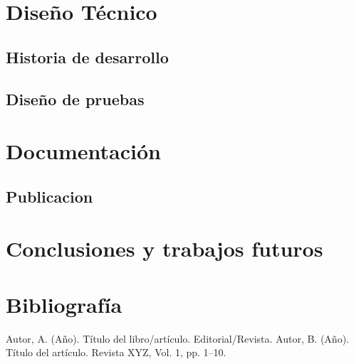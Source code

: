 \documentclass[12pt,a4paper]{report}
\begin{document}
\chapter{Diseño Técnico}

\section{Historia de desarrollo}

\section{Diseño de pruebas}

\chapter{Documentación}

\section{Publicacion}

\chapter{Conclusiones y trabajos futuros}

\chapter*{Bibliografía}
\begin{thebibliography}{99}
     Autor, A. (Año). Título del libro/artículo. Editorial/Revista.
     Autor, B. (Año). Título del artículo. Revista XYZ, Vol. 1, pp. 1--10.
\end{thebibliography}
\end{document}
